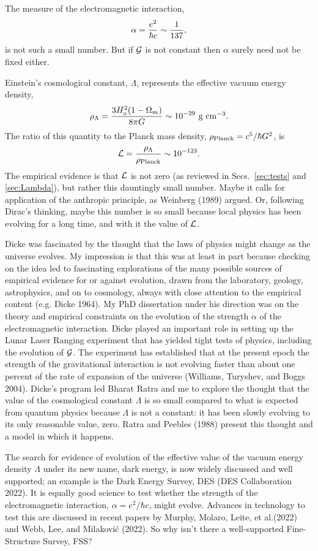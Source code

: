 \documentclass[fleqn,usenatbib]{mnras}
\newcommand{\beq}{\begin{equation}}
\newcommand{\eeq}{\end{equation}}
\begin{document}
The measure of the electromagnetic interaction,
\beq
\alpha = {e^2\over\hbar c}\sim {1\over 137}, \label{eq:alpha}
\eeq
is not such a small number. But if ${\cal G}$ is not constant then $\alpha$ surely need not be fixed either.

Einstein's cosmological constant, $\Lambda$, represents the effective vacuum energy density, 
\beq
\rho_\Lambda = {3 H_{\rm o}^2(1 - \Omega_m)\over 8 \pi G}
\sim 10^{-29}$~g~cm$^{-3}.
\eeq
The ratio of this quantity to the Planck mass density, $\rho_{\rm Planck}=c^5/\hbar G^2$, is
\beq
{\cal L} = {\rho_{\Lambda}\over\rho_{\rm Planck}} \sim 10^{-123}.
\eeq
The empirical evidence is that $\cal L$ is not zero (as reviewed in Secs.~\ref{sec:tests} and \ref{sec:Lambda}), but rather this dauntingly small number. Maybe it calls for application of the anthropic principle, as Weinberg (1989) argued. Or, following Dirac's thinking, maybe this number is so small because local physics has been evolving for a long time, and with it the value of $\cal L$. 

Dicke was fascinated by the thought that the laws of physics might change as the universe evolves. My impression is that this was at least in part because checking on the idea led to fascinating explorations of the many possible sources of empirical evidence for or against evolution, drawn from the laboratory, geology, astrophysics, and on to cosmology, always with close attention to the empirical content (e.g. Dicke 1964). My PhD dissertation under his direction was on the theory and empirical constraints on the evolution of the strength $\alpha$ of the electromagnetic interaction. Dicke played an important role in setting up the Lunar Laser Ranging experiment that has yielded  tight tests of physics, including the evolution of ${\cal G}$. The experiment has established that at the present epoch the strength of the gravitational interaction is not evolving faster than about one percent of the rate of expansion of the universe (Williams, Turyshev, and Boggs 2004). Dicke's program led Bharat Ratra and me to explore the thought that the value of the cosmological constant $\Lambda$ is so small compared to what is expected from quantum physics because $\Lambda$ is not a constant: it has been slowly evolving to its only reasonable value, zero. Ratra and Peebles (1988) present this thought and a model in which it happens. 

 The search for evidence of evolution of the effective value of the vacuum energy density $\Lambda$ under its new name, dark energy, is now widely discussed and well supported; an example is the Dark Energy Survey, DES (DES Collaboration 2022). It is equally good science to test whether the strength of the electromagnetic interaction, $\alpha = e^2/\hbar c$, might evolve. Advances in technology to test this are discussed in recent papers by  Murphy, Molaro, Leite, et al.(2022) and Webb, Lee, and Milakovi{\'c} (2022). So why isn't there a well-supported Fine-Structure Survey, FSS? 
\end{document}
